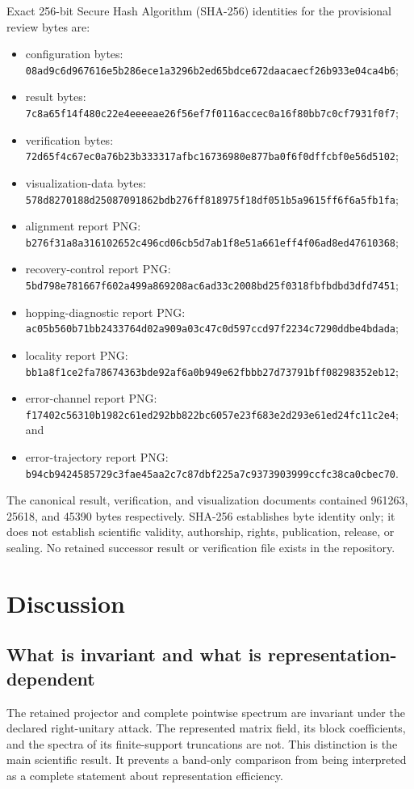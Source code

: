 \documentclass[11pt]{article}
\begin{document}
Exact 256-bit Secure Hash Algorithm (SHA-256) identities for the provisional review
bytes are:
\begin{itemize}
 \item configuration bytes: \nolinkurl{08ad9c6d967616e5b286ece1a3296b2ed65bdce672daacaecf26b933e04ca4b6};
 \item result bytes: \nolinkurl{7c8a65f14f480c22e4eeeeae26f56ef7f0116accec0a16f80bb7c0cf7931f0f7};
 \item verification bytes: \nolinkurl{72d65f4c67ec0a76b23b333317afbc16736980e877ba0f6f0dffcbf0e56d5102};
 \item visualization-data bytes: \nolinkurl{578d8270188d25087091862bdb276ff818975f18df051b5a9615ff6f6a5fb1fa};
 \item alignment report PNG: \nolinkurl{b276f31a8a316102652c496cd06cb5d7ab1f8e51a661eff4f06ad8ed47610368};
 \item recovery-control report PNG: \nolinkurl{5bd798e781667f602a499a869208ac6ad33c2008bd25f0318fbfbdbd3dfd7451};
 \item hopping-diagnostic report PNG: \nolinkurl{ac05b560b71bb2433764d02a909a03c47c0d597ccd97f2234c7290ddbe4bdada};
 \item locality report PNG: \nolinkurl{bb1a8f1ce2fa78674363bde92af6a0b949e62fbbb27d73791bff08298352eb12};
 \item error-channel report PNG: \nolinkurl{f17402c56310b1982c61ed292bb822bc6057e23f683e2d293e61ed24fc11c2e4}; and
 \item error-trajectory report PNG: \nolinkurl{b94cb9424585729c3fae45aa2c7c87dbf225a7c9373903999ccfc38ca0cbec70}.
\end{itemize}
The canonical result, verification, and visualization documents contained 961263,
25618, and 45390 bytes respectively.  SHA-256 establishes byte identity only; it does
not establish scientific validity, authorship, rights, publication, release, or
sealing.  No retained successor result or verification file exists in the repository.

\section{Discussion}

\subsection{What is invariant and what is representation-dependent}

The retained projector and complete pointwise spectrum are invariant under the declared
right-unitary attack.  The represented matrix field, its block coefficients, and the
spectra of its finite-support truncations are not.  This distinction is the main
scientific result.  It prevents a band-only comparison from being interpreted as a
complete statement about representation efficiency.
\end{document}
